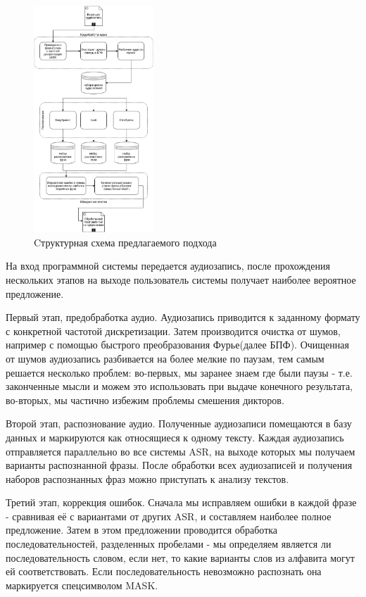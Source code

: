 \documentclass[conference]{IEEEtran}
\begin{document}
\begin{figure}[h]
\centering
\includegraphics[width=0.4\textwidth]{./Diagram1.jpg}
\caption{Cтруктурная схема предлагаемого подхода}
\label{fig:Panel}
\end{figure}

На вход программной системы передается аудиозапись, после прохождения нескольких этапов на выходе пользователь системы получает наиболее вероятное предложение.

Первый этап, предобработка аудио. Аудиозапись приводится к заданному формату с конкретной частотой дискретизации. Затем производится очистка от шумов, например с помощью быстрого преобразования Фурье(далее БПФ). Очищенная от шумов аудиозапись разбивается на более мелкие по паузам, тем самым решается несколько проблем: во-первых, мы заранее знаем где были паузы - т.е. законченные мысли и можем это использовать при выдаче конечного результата, во-вторых, мы частично избежим проблемы смешения дикторов.

Второй этап, распознование аудио. Полученные аудиозаписи помещаются в базу данных и маркируются как относящиеся к одному тексту. Каждая аудиозапись отправляется параллельно во все системы ASR, на выходе которых мы получаем варианты распознанной фразы. После обработки всех аудиозаписей и получения наборов распознанных фраз можно приступать к анализу текстов.

Третий этап, коррекция ошибок. Сначала мы исправляем ошибки в каждой фразе - сравнивая её с вариантами от других ASR, и составляем наиболее полное предложение. Затем в этом предложении проводится обработка последовательностей, разделенных пробелами - мы определяем является ли последовательность словом, если нет, то какие варианты слов из алфавита могут ей соответствовать. Если последовательность невозможно распознать она маркируется спецсимволом MASK.
\end{document}
